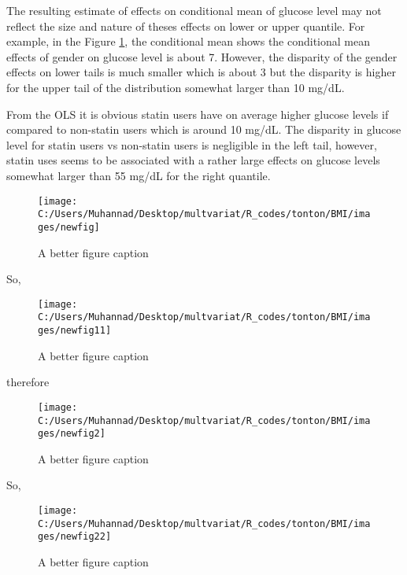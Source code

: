 \documentclass[12pt,]{article}
\begin{document}
The resulting estimate of effects on conditional mean of glucose level
may not reflect the size and nature of theses effects on lower or upper
quantile. For example, in the Figure \ref{fig:resu1}, the conditional
mean shows the conditional mean effects of gender on glucose level is
about 7. However, the disparity of the gender effects on lower tails is
much smaller which is about 3 but the disparity is higher for the upper
tail of the distribution somewhat larger than 10 mg/dL.

From the OLS it is obvious statin users have on average higher glucose
levels if compared to non-statin users which is around 10 mg/dL. The
disparity in glucose level for statin users vs non-statin users is
negligible in the left tail, however, statin uses seems to be associated
with a rather large effects on glucose levels somewhat larger than 55
mg/dL for the right quantile.

\begin{figure}

{\centering \texttt{[image: C:/Users/Muhannad/Desktop/multvariat/R\_codes/tonton/BMI/images/newfig]} 

}

\caption{A better figure caption}\label{fig:resu1}
\end{figure}

So,

\begin{figure}

{\centering \texttt{[image: C:/Users/Muhannad/Desktop/multvariat/R\_codes/tonton/BMI/images/newfig11]} 

}

\caption{A better figure caption}\label{fig:resu12}
\end{figure}

therefore

\begin{figure}

{\centering \texttt{[image: C:/Users/Muhannad/Desktop/multvariat/R\_codes/tonton/BMI/images/newfig2]} 

}

\caption{A better figure caption}\label{fig:unnamed-chunk-3}
\end{figure}

So,

\begin{figure}

{\centering \texttt{[image: C:/Users/Muhannad/Desktop/multvariat/R\_codes/tonton/BMI/images/newfig22]} 

}

\caption{A better figure caption}\label{fig:unnamed-chunk-4}
\end{figure}
\end{document}
